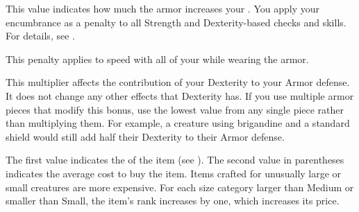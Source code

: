      This value indicates how much the armor increases your .
    You apply your encumbrance as a penalty to all Strength and Dexterity-based checks and skills.
    For details, see .

     This penalty applies to speed with all of your  while wearing the armor.

     This multiplier affects the contribution of your Dexterity to your Armor defense.
    It does not change any other effects that Dexterity has.
    If you use multiple armor pieces that modify this bonus, use the lowest value from any single piece rather than multiplying them.
    For example, a creature using brigandine and a standard shield would still add half their Dexterity to their Armor defense.

     The first value indicates the  of the item (see ).
    The second value in parentheses indicates the average cost to buy the item.
    Items crafted for unusually large or small creatures are more expensive.
    For each size category larger than Medium or smaller than Small, the item's rank increases by one, which increases its price.

